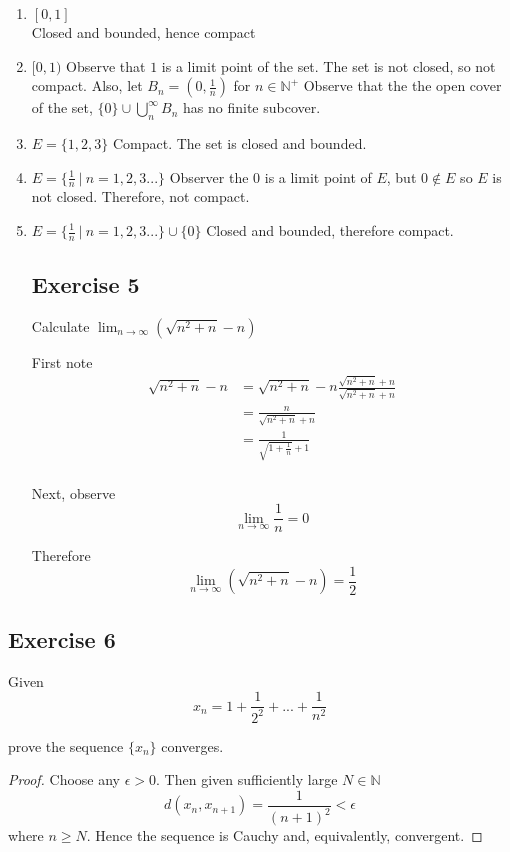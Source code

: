 \documentclass{tufte-book}
\theoremstyle{mytheoremstyle}
\theoremstyle{mylemstyle}
\theoremstyle{mydefstyle}
\begin{document}
\begin{enumerate}

\item $[0,1]$\\
Closed and bounded, hence compact

\item $[0,1)$
Observe that $1$ is a limit point of the set.  The set is not closed, so not compact.  Also, let $B_n = (0, \frac{1}{n})$ for $n \in \mathbb{N}^+$  Observe that the the open cover of the set, $\{0\} \cup \bigcup_n^{\infty} B_n$ has no finite subcover.

\item $E = \{ 1, 2, 3\}$
Compact.   The set is closed and bounded.

\item $E = \{ \frac{1}{n} \ | \ n=1,2,3... \}$
Observer the $0$ is a limit point of $E$, but $0 \notin E$ so $E$ is not closed. Therefore, not compact.

\item $E = \{ \frac{1}{n} \ | \ n=1,2,3... \} \cup \{0\}$  Closed and bounded, therefore compact.

\subsection{Exercise 5}
Calculate $\lim_{n \to \infty}(\sqrt{n^2+n}-n)$

First note
\begin{align*}
\sqrt{n^2+n}-n &= \sqrt{n^2+n}-n \frac{\sqrt{n^2+n}+n}{\sqrt{n^2+n}+n}\\
&=\frac{n}{\sqrt{n^2+n}+n}\\
&= \frac{1}{\sqrt{1 + \frac{1}{n}} + 1}\\
\end{align*}

Next, observe
\[ \lim_{n \to \infty} \frac{1}{n} = 0 \]

Therefore
\[\lim_{n \to \infty}(\sqrt{n^2+n}-n) = \frac{1}{2} \]

\end{enumerate}

\subsection{Exercise 6}
Given
\[ x_n = 1 + \frac{1}{2^2} + ... + \frac{1}{n^2} \]

prove the sequence $\{x_n\}$ converges.

\begin{proof}

Choose any $\epsilon > 0$. Then given sufficiently large $N \in \mathbb{N}$
\[ d(x_n, x_{n+1}) = \frac{1}{(n+1)^2} < \epsilon \]
where $n \geq N$.  Hence the sequence is Cauchy and, equivalently, convergent.

\end{proof}
\end{document}

